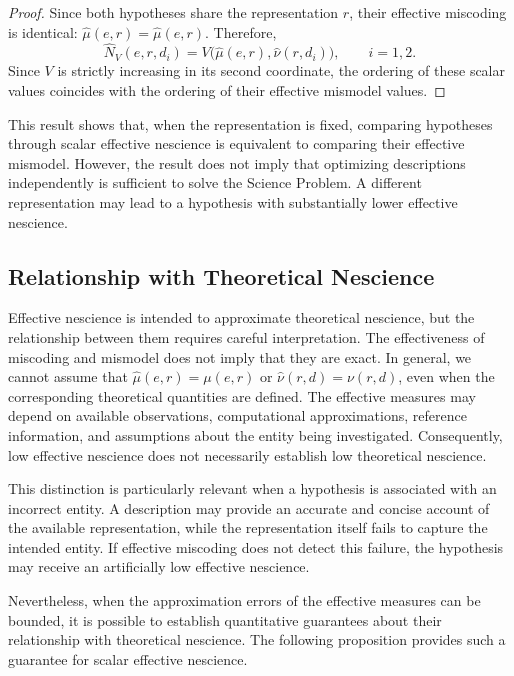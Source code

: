 \begin{proof}
Since both hypotheses share the representation $r$, their effective miscoding is identical: $\widehat\mu(e,r) = \widehat\mu(e,r)$. Therefore,
\[
\widehat N_V(e,r,d_i) = V\bigl(\widehat\mu(e,r),\widehat\nu(r,d_i)\bigr), \qquad i=1,2.
\]
Since $V$ is strictly increasing in its second coordinate, the ordering of these scalar values coincides with the ordering of their effective mismodel values.
\end{proof}

This result shows that, when the representation is fixed, comparing hypotheses through scalar effective nescience is equivalent to comparing their effective mismodel. However, the result does not imply that optimizing descriptions independently is sufficient to solve the Science Problem. A different representation may lead to a hypothesis with substantially lower effective nescience.

\subsection*{Relationship with Theoretical Nescience}

Effective nescience is intended to approximate theoretical nescience, but the relationship between them requires careful interpretation. The effectiveness of miscoding and mismodel does not imply that they are exact. In general, we cannot assume that $\widehat\mu(e,r)=\mu(e,r)$ or $\widehat\nu(r,d)=\nu(r,d)$, even when the corresponding theoretical quantities are defined. The effective measures may depend on available observations, computational approximations, reference information, and assumptions about the entity being investigated. Consequently, low effective nescience does not necessarily establish low theoretical nescience.

This distinction is particularly relevant when a hypothesis is associated with an incorrect entity. A description may provide an accurate and concise account of the available representation, while the representation itself fails to capture the intended entity. If effective miscoding does not detect this failure, the hypothesis may receive an artificially low effective nescience.

Nevertheless, when the approximation errors of the effective measures can be bounded, it is possible to establish quantitative guarantees about their relationship with theoretical nescience. The following proposition provides such a guarantee for scalar effective nescience.

